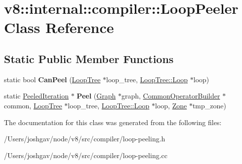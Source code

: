 \hypertarget{classv8_1_1internal_1_1compiler_1_1_loop_peeler}{}\section{v8\+:\+:internal\+:\+:compiler\+:\+:Loop\+Peeler Class Reference}
\label{classv8_1_1internal_1_1compiler_1_1_loop_peeler}
\subsection*{Static Public Member Functions}
\begin{DoxyCompactItemize}
\item 
static bool {\bfseries Can\+Peel} (\hyperlink{classv8_1_1internal_1_1compiler_1_1_loop_tree}{Loop\+Tree} $\ast$loop\+\_\+tree, \hyperlink{classv8_1_1internal_1_1compiler_1_1_loop_tree_1_1_loop}{Loop\+Tree\+::\+Loop} $\ast$loop)\hypertarget{classv8_1_1internal_1_1compiler_1_1_loop_peeler_a5a440876da6d82fd1fe12ad5ce1b979b}{}\label{classv8_1_1internal_1_1compiler_1_1_loop_peeler_a5a440876da6d82fd1fe12ad5ce1b979b}

\item 
static \hyperlink{classv8_1_1internal_1_1compiler_1_1_peeled_iteration}{Peeled\+Iteration} $\ast$ {\bfseries Peel} (\hyperlink{classv8_1_1internal_1_1compiler_1_1_graph}{Graph} $\ast$graph, \hyperlink{classv8_1_1internal_1_1compiler_1_1_common_operator_builder}{Common\+Operator\+Builder} $\ast$common, \hyperlink{classv8_1_1internal_1_1compiler_1_1_loop_tree}{Loop\+Tree} $\ast$loop\+\_\+tree, \hyperlink{classv8_1_1internal_1_1compiler_1_1_loop_tree_1_1_loop}{Loop\+Tree\+::\+Loop} $\ast$loop, \hyperlink{classv8_1_1internal_1_1_zone}{Zone} $\ast$tmp\+\_\+zone)\hypertarget{classv8_1_1internal_1_1compiler_1_1_loop_peeler_aa701b5499ab814205bc82eb549a4eb6b}{}\label{classv8_1_1internal_1_1compiler_1_1_loop_peeler_aa701b5499ab814205bc82eb549a4eb6b}

\end{DoxyCompactItemize}


The documentation for this class was generated from the following files\+:\begin{DoxyCompactItemize}
\item 
/\+Users/joshgav/node/v8/src/compiler/loop-\/peeling.\+h\item 
/\+Users/joshgav/node/v8/src/compiler/loop-\/peeling.\+cc\end{DoxyCompactItemize}
